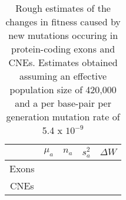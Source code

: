 


\begin{table}
\centering

\caption{Rough estimates of the changes in fitness caused by new mutations occuring in protein-coding exons and CNEs. Estimates obtained assuming an effective population size of 420,000 and a per base-pair per generation mutation rate of 5.4 x $10^{-9}$}
 \begin{tabular}{c c c c c} 

  \hline
		& $\mu_a$ & $n_a$ & $s_a^2$ & $\Delta W$ \\ [0.5ex] \hline
	Exons & & & &  \\
	CNEs  & & & &  \\ \hline
\end{tabular}    

\end{table}
